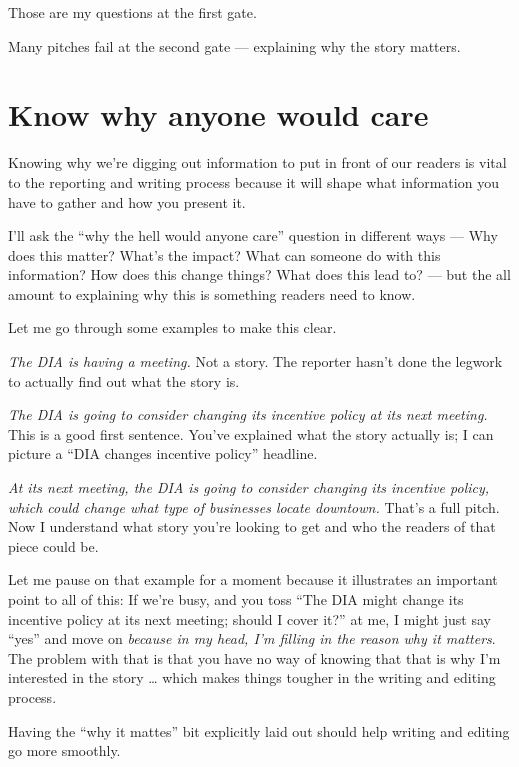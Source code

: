 \documentclass[
  12pt,
  american,
  letterpaperpaper,
  extrafontsizes,onecolumn,openright
  ]{memoir}
\begin{document}
Those are my questions at the first gate.

Many pitches fail at the second gate --- explaining why the story matters.

\hypertarget{know-why-anyone-would-care}{%
\section*{Know why anyone would care}\label{know-why-anyone-would-care}}

Knowing why we're digging out information to put in front of our readers is vital to the reporting and writing process because it will shape what information you have to gather and how you present it.

I'll ask the \enquote{why the hell would anyone care} question in different ways --- Why does this matter? What's the impact? What can someone do with this information? How does this change things? What does this lead to? --- but the all amount to explaining why this is something readers need to know.

Let me go through some examples to make this clear.

\emph{The DIA is having a meeting.} Not a story. The reporter hasn't done the legwork to actually find out what the story is.

\emph{The DIA is going to consider changing its incentive policy at its next meeting.} This is a good first sentence. You've explained what the story actually is; I can picture a \enquote{DIA changes incentive policy} headline.

\emph{At its next meeting, the DIA is going to consider changing its incentive policy, which could change what type of businesses locate downtown.} That's a full pitch. Now I understand what story you're looking to get and who the readers of that piece could be.

Let me pause on that example for a moment because it illustrates an important point to all of this: If we're busy, and you toss \enquote{The DIA might change its incentive policy at its next meeting; should I cover it?} at me, I might just say \enquote{yes} and move on \emph{because in my head, I'm filling in the reason why it matters}. The problem with that is that you have no way of knowing that that is why I'm interested in the story \ldots{} which makes things tougher in the writing and editing process.

Having the \enquote{why it mattes} bit explicitly laid out should help writing and editing go more smoothly.
\end{document}
